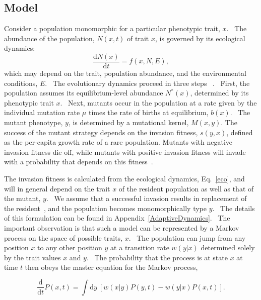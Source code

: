 \subsection{Model}
Consider a population monomorphic for a particular phenotypic trait,
$x$.  The abundance of the population, $N(x,t)$ of trait $x$,
is governed by its ecological dynamics:
%
\begin{equation}
\frac{\mathrm{d} N(x)}{\mathrm{d} t}=f(x,N,E), \label{eco}
\end{equation}
%
which may depend on the trait, population abundance, and the
environmental conditions, $E$.  The evolutionary dynamics proceed in
three steps ~\citep{dieckmann_jmb1996, champagnat2006}.  First, the
population assumes its equilibrium-level abundance $N^{\ast}(x)$,
determined by its phenotypic trait $x$.  Next, mutants occur in the
population at a rate given by the individual mutation rate $\mu$ times
the rate of births at equilibrium, $b(x)$.  The mutant phenotype, $y$,
is determined by a mutational kernel, $M(x,y)$.
The success of the mutant strategy depends on the invasion fitness,
$s(y,x)$, defined as
the per-capita growth rate of a rare population.
Mutants with negative invasion fitness die off, while mutants with
positive invasion
fitness will invade with a probability that depends on this
fitness~\citep{geritz_prl1997}.

The invasion fitness is calculated from the ecological dynamics,
Eq.~\eqref{eco}, and will in general depend on the trait $x$ of the
resident population as well as that of the mutant, $y$.  We assume
that a successful invasion results in replacement of the
resident~\citep{geritz_prl1997, geritz_jmb2002}, and the population
becomes monomorphically type $y$.  The details of this formulation can
be found in Appendix~\ref{AdaptiveDynamics}.  The important
observation is that such a model can be represented by a Markov
process on the space of possible traits, $x$.  The population can jump
from any position $x$ to any other position $y$ at a transition rate
$w(y|x)$ determined solely by the trait values $x$ and $y$.  The
probability that the process is at state $x$ at time $t$ then obeys
the master equation for the Markov process,

\begin{equation}
\frac{\mathrm{d}}{\mathrm{d} t} P(x, t) = \int \mathrm{d} y\  \left[
w(x|y)P(y, t) - w(y|x) P(x,t)\right].
\label{evo.eq.master}
\end{equation}

